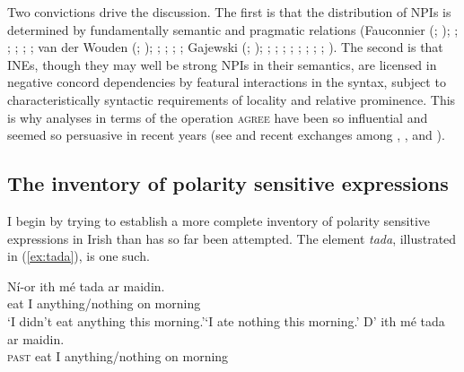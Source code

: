 \documentclass[output=paper,colorlinks,citecolor=brown]{langscibook}
\begin{document}
Two convictions drive the discussion. The first is that the distribution of NPIs is determined by fundamentally semantic and pragmatic relations (Fauconnier (\citeyear{fauconnier:75}; \citeyear{fauconnier:79}); \cite{ladusaw:79}; \cite{heim:84}; \cite{kadmon-landman:93}; \cite{krifka:95}; \cite{zwarts:96}; van der Wouden (\citeyear{van-der-wouden:94}; \citeyear{van-der-wouden:97}); \cite{giannakidou:98}; \cite{lahiri:98}; \cite{von-fintel:99}; \cite{hoeksema:00}; Gajewski (\citeyear{gajewski:05}; \citeyear{gajewski:11}); \cite{guerzoni-sharvit:07}; \cite[Chap. 2]{homer:11}; \cite{chierchia:13}; \cite{crnic:14}; \cite{gajewski-hsieh:14}; \cite{barker:18}; \cite{crnic:18}; \cite{homer:21a}; \cite{jeong-roelofsen:23}).  The second is that INEs, though they may well be strong NPIs in their semantics, are licensed in negative concord dependencies by featural interactions in the syntax, subject to characteristically syntactic requirements of locality and relative prominence. This is why analyses in terms of the operation {\scshape agree} have been so influential and seemed so persuasive in recent years (see \cite{hedde:08} and recent exchanges among \cite{zeijlstra:12}, \cite{preminger-polinsky:15}, \cite{bjorkman-zeijlstra:19} and \cite{deal:22}).

\subsection{The inventory of polarity sensitive expressions}

I begin by trying to establish a more complete inventory of polarity sensitive expressions in Irish than has so far been attempted.  The element {\itshape tada}, illustrated in (\ref{ex:tada}), is one such.

\ea\label{ex:tada}
\ea
\gll Ní-or ith mé tada ar maidin. \\
    {\nior} {eat\past} {I} {anything/nothing} on morning \\
\glt `I didn't eat anything this morning.'\quad `I ate nothing this morning.'
\ex
\gll *D' ith mé tada ar maidin.\label{ex:bad-tada} \\
    {\textsc{past}} {eat\past} {I} {anything/nothing} on morning \\
\z
\z

\end{document}

